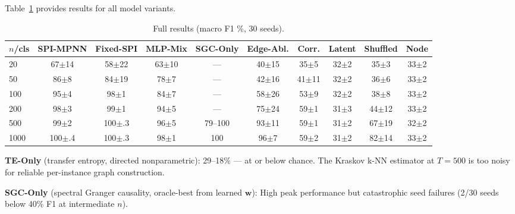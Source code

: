 \documentclass{article}
\theoremstyle{plain}
\begin{document}
Table~\ref{tab:full} provides results for all model variants.

\begin{table}[h]
\caption{Full results (macro F1 \%, 30 seeds).}
\label{tab:full}
\vskip 0.1in
\begin{center}
\begin{small}
\begin{tabular}{lccccccccc}
\toprule
$n$/cls & SPI-MPNN & Fixed-SPI & MLP-Mix & SGC-Only & Edge-Abl. & Corr. & Latent & Shuffled & Node \\
\midrule
20   & 67{\scriptsize$\pm$14} & 58{\scriptsize$\pm$22} & 63{\scriptsize$\pm$10} & ---  & 40{\scriptsize$\pm$15} & 35{\scriptsize$\pm$5}  & 32{\scriptsize$\pm$2} & 35{\scriptsize$\pm$3} & 33{\scriptsize$\pm$2} \\
50   & 86{\scriptsize$\pm$8}  & 84{\scriptsize$\pm$19} & 78{\scriptsize$\pm$7}  & ---  & 42{\scriptsize$\pm$16} & 41{\scriptsize$\pm$11} & 32{\scriptsize$\pm$2} & 36{\scriptsize$\pm$6} & 33{\scriptsize$\pm$2} \\
100  & 95{\scriptsize$\pm$4}  & 98{\scriptsize$\pm$1}  & 84{\scriptsize$\pm$7}  & ---  & 58{\scriptsize$\pm$26} & 53{\scriptsize$\pm$9}  & 32{\scriptsize$\pm$2} & 38{\scriptsize$\pm$8} & 33{\scriptsize$\pm$2} \\
200  & 98{\scriptsize$\pm$3}  & 99{\scriptsize$\pm$1}  & 94{\scriptsize$\pm$5}  & ---  & 75{\scriptsize$\pm$24} & 59{\scriptsize$\pm$1}  & 31{\scriptsize$\pm$3} & 44{\scriptsize$\pm$12}& 33{\scriptsize$\pm$2} \\
500  & 99{\scriptsize$\pm$2}  & 100{\scriptsize$\pm$.3}& 96{\scriptsize$\pm$5}  & 79--100 & 93{\scriptsize$\pm$11}& 59{\scriptsize$\pm$1} & 31{\scriptsize$\pm$2} & 67{\scriptsize$\pm$19}& 32{\scriptsize$\pm$2} \\
1000 & 100{\scriptsize$\pm$.4}& 100{\scriptsize$\pm$.3}& 98{\scriptsize$\pm$1}  & 100  & 96{\scriptsize$\pm$7} & 59{\scriptsize$\pm$2}  & 31{\scriptsize$\pm$2} & 82{\scriptsize$\pm$14}& 33{\scriptsize$\pm$2} \\
\bottomrule
\end{tabular}
\end{small}
\end{center}
\end{table}

\textbf{TE-Only} (transfer entropy, directed nonparametric): 29--18\% --- at or below chance. The Kraskov k-NN estimator at $T{=}500$ is too noisy for reliable per-instance graph construction.

\textbf{SGC-Only} (spectral Granger causality, oracle-best from learned $\mathbf{w}$): High peak performance but catastrophic seed failures (2/30 seeds below 40\% F1 at intermediate $n$).
\end{document}
